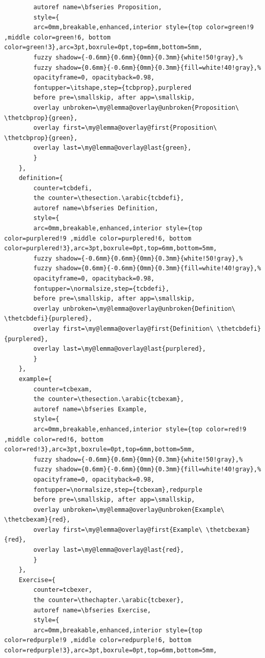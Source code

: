 \documentclass[lang=en,12pt]{beautybook}
\begin{document}
\begin{lstlisting}
        autoref name=\bfseries Proposition,
        style={
        arc=0mm,breakable,enhanced,interior style={top color=green!9 ,middle color=green!6, bottom color=green!3},arc=3pt,boxrule=0pt,top=6mm,bottom=5mm,
        fuzzy shadow={-0.6mm}{0.6mm}{0mm}{0.3mm}{white!50!gray},% 
        fuzzy shadow={0.6mm}{-0.6mm}{0mm}{0.3mm}{fill=white!40!gray},%
        opacityframe=0, opacityback=0.98,
        fontupper=\itshape,step={tcbprop},purplered
        before pre=\smallskip, after app=\smallskip,
        overlay unbroken=\my@lemma@overlay@unbroken{Proposition\ \thetcbprop}{green},
        overlay first=\my@lemma@overlay@first{Proposition\ \thetcbprop}{green},
        overlay last=\my@lemma@overlay@last{green},
        }
    },
    definition={
        counter=tcbdefi,
        the counter=\thesection.\arabic{tcbdefi},
        autoref name=\bfseries Definition,
        style={
        arc=0mm,breakable,enhanced,interior style={top color=purplered!9 ,middle color=purplered!6, bottom color=purplered!3},arc=3pt,boxrule=0pt,top=6mm,bottom=5mm,
        fuzzy shadow={-0.6mm}{0.6mm}{0mm}{0.3mm}{white!50!gray},% 
        fuzzy shadow={0.6mm}{-0.6mm}{0mm}{0.3mm}{fill=white!40!gray},%
        opacityframe=0, opacityback=0.98,
        fontupper=\normalsize,step={tcbdefi},
        before pre=\smallskip, after app=\smallskip,
        overlay unbroken=\my@lemma@overlay@unbroken{Definition\ \thetcbdefi}{purplered},
        overlay first=\my@lemma@overlay@first{Definition\ \thetcbdefi}{purplered},
        overlay last=\my@lemma@overlay@last{purplered},
        }
    },
    example={
        counter=tcbexam,
        the counter=\thesection.\arabic{tcbexam},
        autoref name=\bfseries Example,
        style={
        arc=0mm,breakable,enhanced,interior style={top color=red!9 ,middle color=red!6, bottom color=red!3},arc=3pt,boxrule=0pt,top=6mm,bottom=5mm,
        fuzzy shadow={-0.6mm}{0.6mm}{0mm}{0.3mm}{white!50!gray},% 
        fuzzy shadow={0.6mm}{-0.6mm}{0mm}{0.3mm}{fill=white!40!gray},%
        opacityframe=0, opacityback=0.98,
        fontupper=\normalsize,step={tcbexam},redpurple
        before pre=\smallskip, after app=\smallskip,
        overlay unbroken=\my@lemma@overlay@unbroken{Example\ \thetcbexam}{red},
        overlay first=\my@lemma@overlay@first{Example\ \thetcbexam}{red},
        overlay last=\my@lemma@overlay@last{red},
        }
    },
    Exercise={
        counter=tcbexer,
        the counter=\thechapter.\arabic{tcbexer},
        autoref name=\bfseries Exercise,
        style={
        arc=0mm,breakable,enhanced,interior style={top color=redpurple!9 ,middle color=redpurple!6, bottom color=redpurple!3},arc=3pt,boxrule=0pt,top=6mm,bottom=5mm,

\end{lstlisting}
\end{document}
